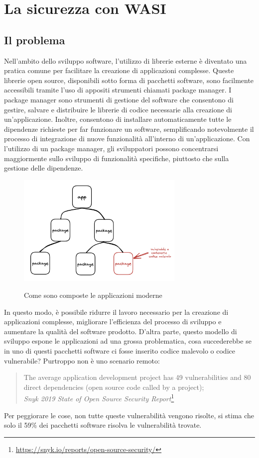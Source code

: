 \section{La sicurezza con WASI}
\subsection{Il problema}
Nell'ambito dello sviluppo software, l'utilizzo di librerie esterne è diventato una pratica comune per facilitare la
creazione di applicazioni complesse. Queste librerie open source, disponibili sotto forma di pacchetti software, sono
facilmente accessibili tramite l'uso di appositi strumenti chiamati package manager. I package manager sono strumenti di
gestione del software che consentono di gestire, salvare e distribuire le librerie di codice necessarie alla creazione
di un'applicazione. Inoltre, consentono di installare automaticamente tutte le dipendenze richieste per far funzionare
un software, semplificando notevolmente il processo di integrazione di nuove funzionalità all'interno di
un'applicazione. Con l'utilizzo di un package manager, gli sviluppatori possono concentrarsi maggiormente sullo sviluppo
di funzionalità specifiche, piuttosto che sulla gestione delle dipendenze.
\begin{figure}[h]
    \centering
    \captionsetup{justification=centering}
    \includegraphics[width=8cm]{./chapters/2.wasi-in-depth/images/1.malicious_or_vuln_code.png}
    \label{app_package}
    \caption{Come sono composte le applicazioni moderne}
\end{figure}
In questo modo, è possibile ridurre il lavoro necessario per la creazione di applicazioni complesse, migliorare
l'efficienza del processo di sviluppo e aumentare la qualità del software prodotto. D'altra parte, questo modello di
sviluppo espone le applicazioni ad una grossa problematica, cosa succederebbe se in uno di questi pacchetti software ci
fosse inserito codice malevolo o codice vulnerabile? Purtroppo non è uno scenario remoto:
\begin{quote}
    The average application development project has 49 vulnerabilities and 80 direct dependencies (open source code
    called by a project); \\
    \textit{Snyk 2019 State of Open Source Security
    Report}\footnote{\url{https://snyk.io/reports/open-source-security/}}
\end{quote}
Per peggiorare le cose, non tutte queste vulnerabilità vengono risolte, si stima che solo il 59\% dei pacchetti software
risolva le vulnerabilità trovate.
